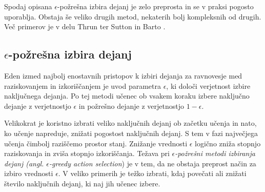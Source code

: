 \documentclass[a4paper, oneside, 12pt]{report}
\begin{document}
Spodaj opisana $\epsilon$-požrešna izbira dejanj je zelo preprosta in se v praksi pogosto uporablja. Obstaja še veliko drugih metod, nekaterih bolj kompleksnih od drugih. Več primerov je v delu Thrun \cite{TheRoleOfExplorationInLearningControl} ter Sutton in Barto \cite{ReinforcementLearningAnIntroduction}.

\subsection{$\epsilon$-požrešna izbira dejanj}
Eden izmed najbolj enostavnih pristopov k izbiri dejanja za ravnovesje med raziskovanjem in izkoriščanjem je uvod parametra $\epsilon$, ki določi verjetnost izbire naključnega dejanja. Po tej metodi učenec ob vsakem koraku izbere naključno dejanje z verjetnostjo $\epsilon$ in požrešno dejanje z verjetnostjo $1 - \epsilon$.

Velikokrat je koristno izbrati veliko naključnih dejanj ob začetku učenja in nato, ko učenje napreduje, znižati pogostost naključnih dejanj. S tem v fazi največjega učenja čimbolj raziščemo prostor stanj. Znižanje vrednosti $\epsilon$ logično zniža stopnjo raziskovanja in zviša stopnjo izkoriščanja. Težava pri {\em $\epsilon$-požrešni metodi izbiranja dejanj (angl. $\epsilon$-greedy action selection}) je v tem, da ne obstaja preprost način za izbiro vrednosti $\epsilon$. V veliko primerih je težko izbrati, kdaj povečati ali znižati število naključnih dejanj, ki naj jih učenec izbere.




\end{document}
